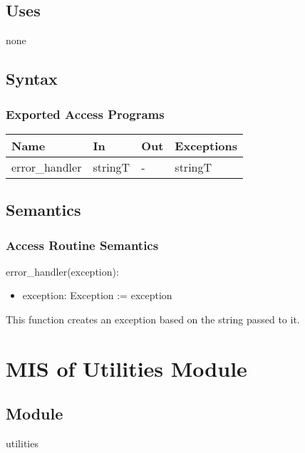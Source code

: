 \documentclass[12pt, titlepage]{article}
\begin{document}
\subsection{Uses}
none

\subsection{Syntax}

\subsubsection{Exported Access Programs}

\begin{center}
\begin{tabular}{p{4cm} p{3cm} p{2cm} p{2.5cm}}
\hline
\textbf{Name} & \textbf{In} & \textbf{Out} & \textbf{Exceptions} \\
\hline
error\_handler & stringT & - & stringT \\
\hline
\end{tabular}
\end{center}

\subsection{Semantics}

\subsubsection{Access Routine Semantics}

\noindent error\_handler(exception):
\begin{itemize}
\item exception: Exception := exception
\end{itemize}

This function creates an exception based on the string passed to it.

\newpage

\section{MIS of Utilities Module} \label{um}

\subsection{Module}
utilities
\end{document}
